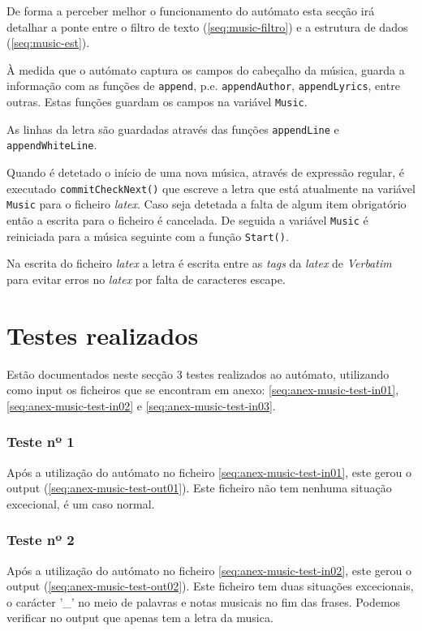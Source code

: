 De forma a perceber melhor o funcionamento do autómato esta secção irá detalhar a ponte entre o filtro de texto (\ref{seq:music-filtro}) e a estrutura de dados (\ref{seq:music-est}).

À medida que o autómato captura os campos do cabeçalho da música, guarda a informação com as funções de \verb!append!, p.e. \verb!appendAuthor!, \verb!appendLyrics!, entre outras. Estas funções guardam os campos na variável \verb!Music!.

As linhas da letra são guardadas através das funções \verb!appendLine! e \verb!appendWhiteLine!.

Quando é detetado o início de uma nova música, através de expressão regular, é executado \verb!commitCheckNext()! que escreve a letra que está atualmente na variável \verb!Music! para o ficheiro \emph{latex}. Caso seja detetada a falta de algum item obrigatório então a escrita para o ficheiro é cancelada.
De seguida a variável \verb!Music! é reiniciada para a música seguinte com a função \verb!Start()!.

Na escrita do ficheiro \emph{latex} a letra é escrita entre as \emph{tags} da \emph{latex} de \emph{Verbatim} para evitar erros no \emph{latex} por falta de caracteres escape.

\section{Testes realizados}
\label{seq:music-test}
Estão documentados neste secção 3 testes realizados ao autómato, utilizando como input os ficheiros que se encontram em anexo: \ref{seq:anex-music-test-in01}, \ref{seq:anex-music-test-in02} e \ref{seq:anex-music-test-in03}.

\subsubsection{Teste nº 1}

Após a utilização do autómato no ficheiro \ref{seq:anex-music-test-in01}, este gerou o output (\ref{seq:anex-music-test-out01}).
Este ficheiro não tem nenhuma situação excecional, é um caso normal.

\subsubsection{Teste nº 2}

Após a utilização do autómato no ficheiro \ref{seq:anex-music-test-in02}, este gerou o output (\ref{seq:anex-music-test-out02}).
Este ficheiro tem duas situações excecionais, o carácter '\_' no meio de palavras e notas musicais no fim das frases.
Podemos verificar no output que apenas tem a letra da musica.

